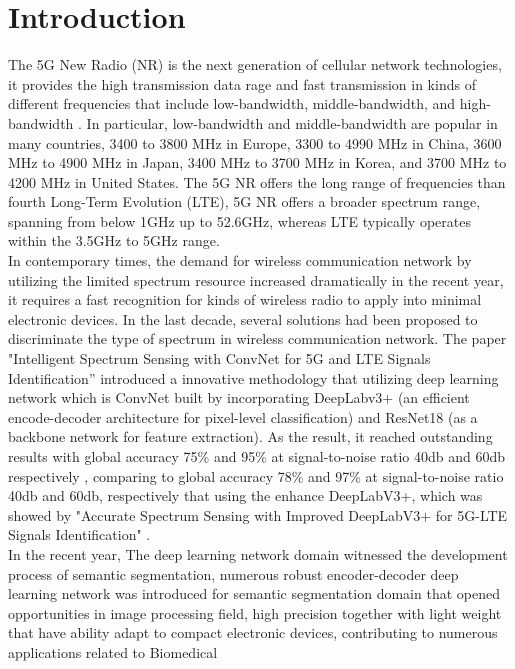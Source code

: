 \documentclass[journal]{IEEEtran} %
\begin{document}
\section{Introduction}
The 5G New Radio (NR) is the next generation of cellular network technologies, it provides the high transmission data rage and fast transmission in kinds of different frequencies that include low-bandwidth, middle-bandwidth, and high-bandwidth \cite{b7}. In particular, low-bandwidth and middle-bandwidth are popular in many countries, 3400 to 3800 MHz in Europe, 3300 to 4990 MHz in China, 3600 MHz to 4900 MHz in Japan, 3400 MHz to 3700 MHz in Korea, and 3700 MHz to 4200 MHz in United States. The 5G NR offers the long range of frequencies than fourth Long-Term Evolution (LTE), 5G NR offers a broader spectrum range, spanning from below 1GHz up to 52.6GHz, whereas LTE typically operates within the 3.5GHz to 5GHz range.
\\
\indent
In contemporary times, the demand for wireless communication network by utilizing the limited spectrum resource increased dramatically in the recent year, it requires a fast recognition for kinds of wireless radio to apply into minimal electronic devices. In the last decade, several solutions had been proposed to discriminate the type of spectrum in wireless communication network. The paper "Intelligent Spectrum Sensing with ConvNet for 5G and LTE Signals Identification”\cite{b1} introduced a innovative methodology that utilizing deep learning network which is ConvNet built by incorporating DeepLabv3+ (an efficient encode-decoder architecture for pixel-level classification) and ResNet18 (as a backbone network for feature extraction). As the result, it reached outstanding results with global accuracy 75\% and 95\% at signal-to-noise ratio 40db and 60db respectively \cite{b1}, comparing to global accuracy 78\% and 97\% at signal-to-noise ratio 40db and 60db, respectively that using the enhance DeepLabV3+, which was showed by "Accurate Spectrum Sensing with Improved DeepLabV3+ for 5G-LTE Signals Identification" \cite{b2}.
\\
\indent
In the recent year, The deep learning network domain witnessed the development process of semantic segmentation, numerous robust encoder-decoder deep learning network was introduced for semantic segmentation domain that opened opportunities in image processing field, high precision together with light weight that have ability adapt to compact electronic devices, contributing to numerous applications related to Biomedical
\end{document}

